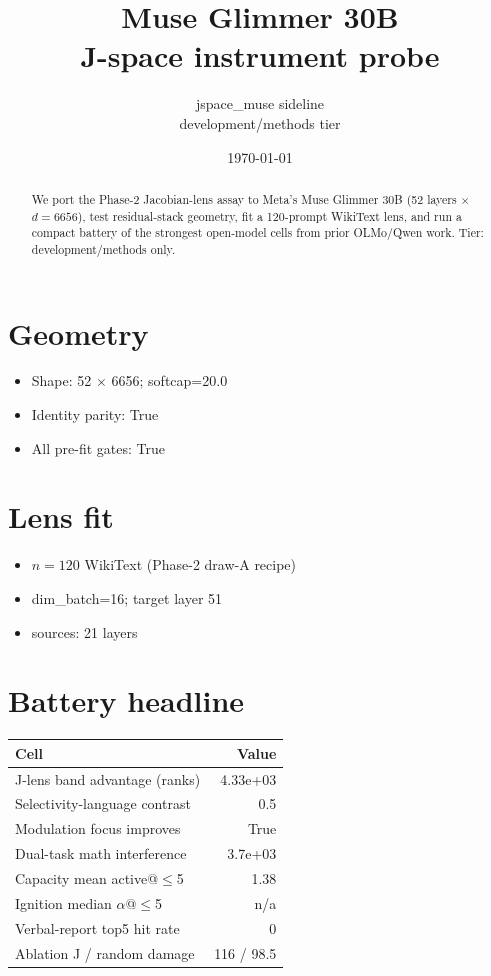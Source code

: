 \documentclass[11pt]{article}
\title{Muse Glimmer 30B \\ J-space instrument probe}
\author{jspace\_muse sideline \\ development/methods tier}
\date{\today}
\begin{document}
\maketitle

\begin{abstract}
We port the Phase-2 Jacobian-lens assay to Meta's Muse Glimmer 30B
(52 layers $\times$ $d=6656$), test residual-stack geometry, fit a
120-prompt WikiText lens, and run a compact battery of the strongest
open-model cells from prior OLMo/Qwen work. Tier: development/methods only.
\end{abstract}

\section{Geometry}
\begin{itemize}
  \item Shape: 52 $\times$ 6656; softcap=20.0
  \item Identity parity: True
  \item All pre-fit gates: True
\end{itemize}

\section{Lens fit}
\begin{itemize}
  \item $n=120$ WikiText (Phase-2 draw-A recipe)
  \item dim\_batch=16; target layer 51
  \item sources: 21 layers
\end{itemize}

\section{Battery headline}
\begin{center}
\begin{tabular}{lr}
\toprule
Cell & Value \\
\midrule
J-lens band advantage (ranks) & 4.33e+03 \\
Selectivity-language contrast & 0.5 \\
Modulation focus improves & True \\
Dual-task math interference & 3.7e+03 \\
Capacity mean active@$\le$5 & 1.38 \\
Ignition median $\alpha$@$\le$5 & n/a \\
Verbal-report top5 hit rate & 0 \\
Ablation J / random damage & 116 / 98.5 \\
\bottomrule
\end{tabular}
\end{center}
\end{document}
